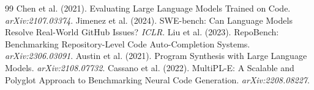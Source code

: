 \documentclass[11pt,a4paper]{article}
\begin{document}

\begin{thebibliography}{99}
 Chen et al. (2021). Evaluating Large Language Models Trained on Code. \textit{arXiv:2107.03374}.
 Jimenez et al. (2024). SWE-bench: Can Language Models Resolve Real-World GitHub Issues? \textit{ICLR}.
 Liu et al. (2023). RepoBench: Benchmarking Repository-Level Code Auto-Completion Systems. \textit{arXiv:2306.03091}.
 Austin et al. (2021). Program Synthesis with Large Language Models. \textit{arXiv:2108.07732}.
 Cassano et al. (2022). MultiPL-E: A Scalable and Polyglot Approach to Benchmarking Neural Code Generation. \textit{arXiv:2208.08227}.
\end{thebibliography}
\end{document}
